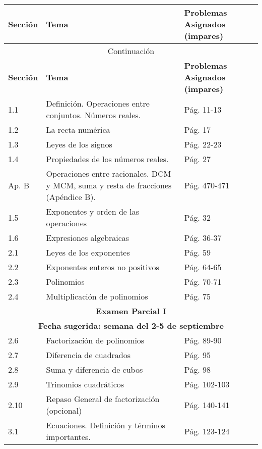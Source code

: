 \documentclass{article}
\begin{document}
\begin{longtable}{|p{}|p{}|p{}|}
    \hline
    \textbf{Sección} & \textbf{Tema} & \textbf{Problemas Asignados (impares)} \\
    \hline
    \endfirsthead
    \hline
    \multicolumn{3}{|c|}{Continuación} \\
    \hline
    \textbf{Sección} & \textbf{Tema} & \textbf{Problemas Asignados (impares)} \\
    \hline
    \endhead
    \hline
    \endfoot
    \hline
    \endlastfoot

    1.1 & Definición. Operaciones entre conjuntos. Números reales. & Pág. 11-13 \\
    \hline
    1.2 & La recta numérica & Pág. 17 \\
    \hline
    1.3 & Leyes de los signos & Pág. 22-23 \\
    \hline
    1.4 & Propiedades de los números reales. & Pág. 27 \\
    \hline
    Ap. B & Operaciones entre racionales. DCM y MCM, suma y resta de fracciones (Apéndice B). & Pág. 470-471 \\
    \hline
    1.5 & Exponentes y orden de las operaciones & Pág. 32 \\
    \hline
    1.6 & Expresiones algebraicas & Pág. 36-37 \\
    \hline
    2.1 & Leyes de los exponentes & Pág. 59 \\
    \hline
    2.2 & Exponentes enteros no positivos & Pág. 64-65 \\
    \hline
    2.3 & Polinomios & Pág. 70-71 \\
    \hline
    2.4 & Multiplicación de polinomios & Pág. 75 \\
    \hline
    \multicolumn{3}{|c|}{\textbf{Examen Parcial I}} \\
    \multicolumn{3}{|c|}{\textbf{Fecha sugerida: semana del 2-5 de septiembre}} \\
    \hline
    2.6 & Factorización de polinomios & Pág. 89-90 \\
    \hline
    2.7 & Diferencia de cuadrados & Pág. 95 \\
    \hline
    2.8 & Suma y diferencia de cubos & Pág. 98 \\
    \hline
    2.9 & Trinomios cuadráticos & Pág. 102-103 \\
    \hline
    2.10 & Repaso General de factorización (opcional) & Pág. 140-141 \\
    \hline
    3.1 & Ecuaciones. Definición y términos importantes. & Pág. 123-124 \\

\end{longtable}
\end{document}
